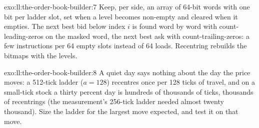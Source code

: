 \begin{solution}{exo:ll:the-order-book-builder:7}
Keep, per side, an array of 64-bit words with one bit per ladder slot, set when a level becomes non-empty and cleared when it
empties. The next best bid below index $i$ is found word by word with count-leading-zeros on the masked word, the next best ask
with count-trailing-zeros: a few instructions per 64 empty slots instead of 64 loads. Recentring rebuilds the bitmaps with the
levels.
\end{solution}

\begin{solution}{exo:ll:the-order-book-builder:8}
A quiet day says nothing about the day the price moves: a 512-tick ladder ($a = 128$) recentres once per 128 ticks of travel,
and on a small-tick stock a thirty percent day is hundreds of thousands of ticks, thousands of recentrings (the measurement's
256-tick ladder needed almost twenty thousand). Size the ladder for the largest move expected, and test it on that move.
\end{solution}

